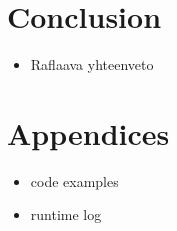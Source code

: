 \section{Conclusion}
\begin{itemize}
\item Raflaava yhteenveto
\end{itemize}

\section{Appendices}
\begin{itemize}
\item code examples
\item runtime log
\end{itemize}





  


\else

\fi